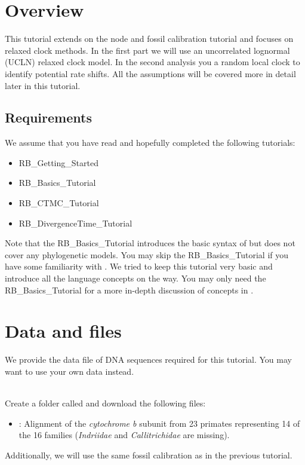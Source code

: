 \section{Overview}

This tutorial extends on the node and fossil calibration tutorial and focuses on relaxed clock methods. 
In the first part we will use an uncorrelated lognormal (UCLN) relaxed clock model.
In the second analysis you a random local clock to identify potential rate shifts.
All the assumptions will be covered more in detail later in this tutorial.

\subsection*{Requirements}
We assume that you have read and hopefully completed the following tutorials:
\begin{itemize}
\item RB\_Getting\_Started
\item RB\_Basics\_Tutorial
\item RB\_CTMC\_Tutorial
\item RB\_DivergenceTime\_Tutorial
\end{itemize}
Note that the RB\_Basics\_Tutorial introduces the basic syntax of \Rev but does not cover any phylogenetic models.
You may skip the RB\_Basics\_Tutorial if you have some familiarity with \R.
We tried to keep this tutorial very basic and introduce all the language concepts on the way.
You may only need the RB\_Basics\_Tutorial for a more in-depth discussion of concepts in \Rev.


\section{Data and files}\label{Sec:data}

We provide the data file of DNA sequences required for this tutorial.
You may want to use your own data instead.

\noindent \\ \impmark Create a folder called  and download the following files:
\begin{itemize}
\item \href{http://rawgit.com/revbayes/revbayes_tutorial/master/RB_DivergenceTimeRelaxedClock_Tutorial/data/primates_cytb.nex}{}: Alignment of the \textit{cytochrome b} subunit from 23 primates representing 14 of the 16 families (\textit{Indriidae} and \textit{Callitrichidae} are missing).
\end{itemize}
Additionally, we will use the same fossil calibration as in the previous tutorial.




